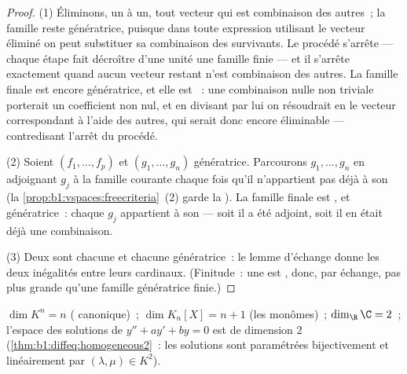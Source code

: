 \begin{proof}
(1) Éliminons, un à un, tout vecteur qui est combinaison des autres~;
la famille reste génératrice, puisque dans toute expression
utilisant le vecteur éliminé on peut substituer sa combinaison des
survivants. Le procédé s'arrête --- chaque étape fait décroître
d'une unité une famille finie --- et il s'arrête exactement quand
aucun vecteur restant n'est combinaison des autres. La famille
finale est encore génératrice, et elle est ~: une combinaison
nulle non triviale porterait un coefficient non nul, et en divisant
par lui on résoudrait en le vecteur correspondant à l'aide des
autres, qui serait donc encore éliminable --- contredisant l'arrêt
du procédé.

(2) Soient $(f_1, \dots, f_p)$  et $(g_1, \dots, g_n)$
génératrice. Parcourons $g_1, \dots, g_n$ en adjoignant $g_j$ à la
famille courante chaque fois qu'il n'appartient pas déjà à son
(la \cref{prop:b1:vspaces:freecriteria}~(2) garde la ).
La famille finale est , et génératrice~: chaque $g_j$ appartient
à son  --- soit il a été adjoint, soit il en
était déjà une combinaison.

(3) Deux  sont chacune  et chacune génératrice~: le lemme
d'échange donne les deux inégalités entre leurs cardinaux. (Finitude~:
une  est , donc, par échange, pas plus grande qu'une famille
génératrice finie.)
\end{proof}

\begin{example}\label{ex:b1:findim:dims}
$\dim K^n = n$ ( canonique)~; $\dim K_n[X] = n + 1$ (les
monômes)~; $\dim_\R \C = 2$~; l'espace des solutions de $y'' + ay' +
by = 0$ est de dimension $2$ (\cref{thm:b1:diffeq:homogeneous2}~: les
solutions sont paramétrées bijectivement et linéairement par
$(\lambda, \mu) \in K^2$).
\end{example}

